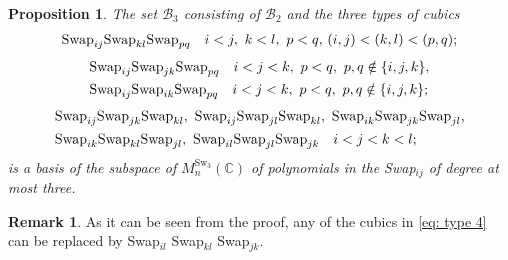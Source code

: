 \documentclass[12pt,dvipsnames,accepted=2016-08-18,a4paper,onecolumn]{quantumarticle}
\numberwithin{equation}{section}
\newtheorem{proposition}[theorem]{Proposition}
\theoremstyle{definition}
\newtheorem{remark}[theorem]{Remark}
\begin{document}
\begin{proposition}\label{prop: indep3}
	The set $\mathcal{B}_3$ consisting of $\mathcal{B}_2$ and the three types of cubics
	\begin{equation}\label{eq: type 6}
		\begin{split}
		&\textnormal{Swap}_{ij} \textnormal{Swap}_{kl} \textnormal{Swap}_{pq} \quad 
		i < j, \ k < l,\  p < q,  \, (i,j) < (k,l) < (p,q);\\
	\end{split}
\end{equation}
\begin{equation}\label{eq: type 5}
	\begin{split}
		&\textnormal{Swap}_{ij} \textnormal{Swap}_{jk} \textnormal{Swap}_{pq} \quad i < j < k,\  p<q,\ p,q \notin \{i,j,k\},\\
		&\textnormal{Swap}_{ij} \textnormal{Swap}_{ik} \textnormal{Swap}_{pq} \quad i < j < k,\ p<q, \ p,q \notin \{i,j,k\};\\
		\end{split}
	\end{equation}
\begin{equation}\label{eq: type 4}
	\begin{split}
	&\textnormal{Swap}_{ij} \textnormal{Swap}_{jk} \textnormal{Swap}_{kl}, \ 
	\textnormal{Swap}_{ij} \textnormal{Swap}_{jl} \textnormal{Swap}_{kl},\ 
	\textnormal{Swap}_{ik} \textnormal{Swap}_{jk} \textnormal{Swap}_{jl},\\
	&\textnormal{Swap}_{ik} \textnormal{Swap}_{kl} \textnormal{Swap}_{jl},\ 
	\textnormal{Swap}_{il} \textnormal{Swap}_{jl} \textnormal{Swap}_{jk}
	\quad i < j < k < l;\\		
\end{split}
\end{equation}
	is a basis of the subspace of $M^{\text{Sw}_3}_n(\mathbb{C})$ of polynomials in the Swap$_{ij}$ of degree at most three. 
\end{proposition}

\begin{remark}
	As it can be seen from the proof, any of the cubics in \eqref{eq: type 4} can be replaced by Swap$_{il}$ Swap$_{kl}$ Swap$_{jk}.$
\end{remark}

	
\end{document}
